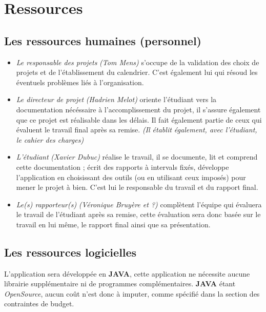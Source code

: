 \documentclass[runningheads]{llncs}
\newcommand{\term}[1]{\textit{\textcolor{maintitle}{#1}}}
\begin{document}
\section{Ressources}\label{sec:organisation}

\subsection{Les ressources humaines (personnel)}

\begin{itemize}
\item \term{Le responsable des projets} \textit{(Tom Mens)} s'occupe de la validation des choix de projets et de l'établissement 
du calendrier. C'est également lui qui résoud les éventuels problèmes liés à l'organisation.
\item \term{Le directeur de projet} \textit{(Hadrien Melot)} oriente l'étudiant vers la documentation nécéssaire à 
l'accomplissement du projet, il s'assure également que ce projet est réalisable dans les délais. Il fait également partie de ceux
qui évaluent le travail final après sa remise. \textit{(Il établit également, avec l'étudiant, le cahier des charges)}
\item \term{L'étudiant} \textit{(Xavier Dubuc)} réalise le travail, il se documente, lit et comprend cette documentation ; écrit 
des rapports à intervals fixés, développe l'application en choisissant des outils (ou en utilisant ceux imposés) pour mener le 
projet à bien. C'est lui le responsable du travail et du rapport final.
\item \term{Le(s) rapporteur(s)} \textit{(Véronique Bruyère et ?)} complètent l'équipe qui évaluera le travail de l'étudiant après 
sa remise, cette évaluation sera donc basée sur le travail en lui même, le rapport final ainsi que sa présentation.
\end{itemize}

\subsection{Les ressources logicielles}

L'application sera développée en \textbf{JAVA}, cette application ne nécessite aucune librairie supplémentaire ni de programmes 
complémentaires. \textbf{JAVA} étant \textit{OpenSource}, aucun coût n'est donc à imputer, comme spécifié dans la section des 
contraintes de budget.
\end{document}
